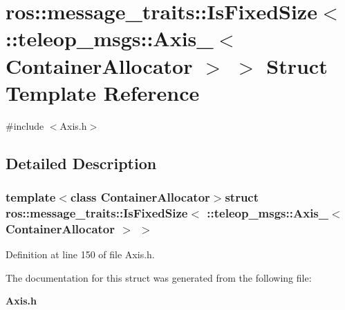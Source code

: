 \section{ros::message\_\-traits::IsFixedSize$<$ ::teleop\_\-msgs::Axis\_\-$<$ ContainerAllocator $>$ $>$ Struct Template Reference}
\label{structros_1_1message__traits_1_1IsFixedSize_3_01_1_1teleop__msgs_1_1Axis___3_01ContainerAllocator_01_4_01_4}


{\ttfamily \#include $<$Axis.h$>$}



\subsection{Detailed Description}
\subsubsection*{template$<$class ContainerAllocator$>$struct ros::message\_\-traits::IsFixedSize$<$ ::teleop\_\-msgs::Axis\_\-$<$ ContainerAllocator $>$ $>$}



Definition at line 150 of file Axis.h.



The documentation for this struct was generated from the following file:\begin{DoxyCompactItemize}
\item 
{\bf Axis.h}\end{DoxyCompactItemize}
